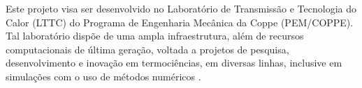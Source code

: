 Este projeto visa ser desenvolvido no Laboratório de Transmissão e Tecnologia do Calor (LTTC) do Programa de Engenharia Mecânica da Coppe (PEM/COPPE). 
Tal laboratório dispõe de uma ampla infraestrutura, 
além de recursos computacionais de última geração, 
voltada a projetos de pesquisa, desenvolvimento e inovação
em termociências, em diversas linhas, 
inclusive em simulações com o uso de métodos numéricos \cite{lttccoppe}. 


